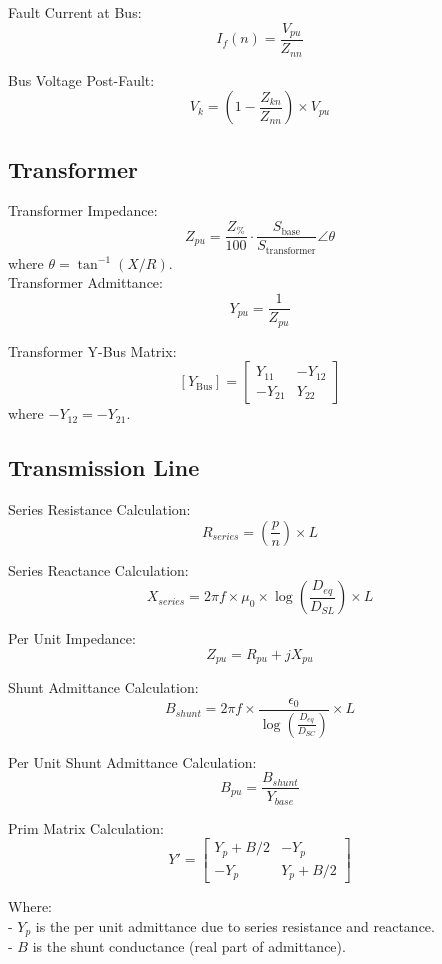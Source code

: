 \documentclass{article}
\begin{document}
	\noindent
	Fault Current at Bus: 
	\[
	I_f(n) = \frac{V_{pu}}{Z_{nn}}
	\]
	
	\noindent
	Bus Voltage Post-Fault: 
	\[
	V_k = (1 - \frac{ Z_{kn} }{ Z_{nn} }) \times V_{pu}
	\]
	
	\subsection*{Transformer}
	\noindent
	Transformer Impedance:
	\[ Z_{pu} = \frac{Z_\%}{100} \cdot \frac{S_{\text{base}}}{S_{\text{transformer}}} \angle{\theta} \]
	where \( \theta = \tan^{-1}(X/R) \). \\
	
	\noindent
	Transformer Admittance:
	\[ Y_{pu} = \frac{1}{Z_{pu}} \]
	
	\noindent
	Transformer Y-Bus Matrix:
	\[ [Y_{\text{Bus}}] = 
	\begin{bmatrix}
		Y_{11} & -Y_{12} \\
		-Y_{21} & Y_{22}
	\end{bmatrix} \]
	where \( -Y_{12} = -Y_{21} \).
	
	\subsection*{Transmission Line}
	Series Resistance Calculation: 
	\[
	R_{series} = (\frac{p}{n}) \times L
	\]
	
	\noindent	
	Series Reactance Calculation: 
	\[
	X_{series} = 2 \pi f \times \mu_0 \times \log(\frac{D_{eq}}{D_{SL}}) \times L
	\]
	
	\noindent
	Per Unit Impedance: 
	\[
	Z_{pu} = R_{pu} + j X_{pu}
	\]
	
	\noindent
	Shunt Admittance Calculation: 
	\[
	B_{shunt} = 2 \pi f \times \frac{\epsilon_0}{\log(\frac{D_{eq}}{D_{SC}})} \times L
	\]
	
	\noindent
	Per Unit Shunt Admittance Calculation: 
	\[
	B_{pu} = \frac{B_{shunt}}{Y_{base}}
	\]
	
	\noindent	
	Prim Matrix Calculation:
	\[
	Y' = \begin{bmatrix}
		Y_p + B/2 & -Y_p \\
		-Y_p & Y_p + B/2
	\end{bmatrix}
	\]
	
	\noindent
	Where: \\
	- \(Y_p\) is the per unit admittance due to series resistance and reactance. \\
	- \(B\) is the shunt conductance (real part of admittance).
	
\end{document}
